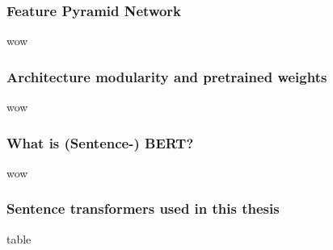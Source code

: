 \documentclass[aspectratio=1610]{beamer}
\begin{document}
\normalpage

\begin{frame}
  \frametitle{Feature Pyramid Network}
wow
\end{frame}
\normalpage

\begin{frame}
  \frametitle{Architecture modularity and pretrained weights}
wow
\end{frame}
\normalpage

\begin{frame}
  \frametitle{What is (Sentence-) BERT?}
wow
\end{frame}
\normalpage

\begin{frame}
  \frametitle{Sentence transformers used in this thesis}
table
\end{frame}
\normalpage
\end{document}

